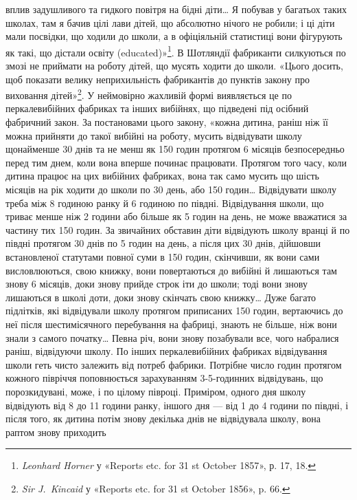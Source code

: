 \parcont{}  %
вплив задушливого та гидкого повітря на бідні діти\dots{} Я побував
у багатьох таких школах, там я бачив цілі лави дітей, що абсолютно
нічого не робили; і ці діти мали посвідки, що ходили до
школи, а в офіціяльній статистиці вони фігурують як такі, що
дістали освіту (educated)»\footnote{
\emph{Leonhard Horner} у «Reports etc. for 31 st October 1857», р. 17, 18.
}. В Шотляндії фабриканти силкуються
по змозі не приймати на роботу дітей, що мусять ходити до школи.
«Цього досить, щоб показати велику неприхильність фабрикантів
до пунктів закону про виховання дітей»\footnote{
\emph{Sir J.~Kincaid} у «Reports etc. for 31 st October 1856», p. 66.
}. У неймовірно
жахливій формі виявляється це по перкалевибійних фабриках та
інших вибійнях, що підведені під осібний фабричний закон.
За постановами цього закону, «кожна дитина, раніш ніж її можна
прийняти до такої вибійні на роботу, мусить відвідувати школу
щонайменше 30 днів та не менш як 150 годин протягом 6 місяців
безпосередньо перед тим днем, коли вона вперше починає працювати.
Протягом того часу, коли дитина працює на цих вибійних
фабриках, вона так само мусить що шість місяців на рік ходити
до школи по 30 день, або 150 годин\dots{} Відвідувати школу треба
між 8 годиною ранку й 6 годиною по півдні. Відвідування школи,
що триває менше ніж 2  години або більше як 5 годин на день,
не може вважатися за частину тих 150 годин. За звичайних обставин
діти відвідують школу вранці й по півдні протягом 30 днів
по 5 годин на день, а після цих 30 днів, дійшовши встановленої
статутами повної суми в 150 годин, скінчивши, як вони сами
висловлюються, свою книжку, вони повертаються до вибійні
й лишаються там знову 6 місяців, доки знову прийде строк іти
до школи; тоді вони знову лишаються в школі доти, доки знову
скінчать свою книжку\dots{} Дуже багато підлітків, які відвідували
школу протягом приписаних 150 годин, вертаючись до неї після
шестимісячного перебування на фабриці, знають не більше, ніж
вони знали з самого початку\dots{} Певна річ, вони знову позабували
все, чого набралися раніш, відвідуючи школу. По інших перкалевибійних
фабриках відвідування школи геть чисто залежить від
потреб фабрики. Потрібне число годин протягом кожного півріччя
поповнюється зарахуванням 3-5-годинних відвідувань, що порозкидувані,
може, і по цілому півроці. Приміром, одного дня
школу відвідують від 8 до 11 години ранку, іншого дня — від
1 до 4 години по півдні, і після того, як дитина потім знову декілька
днів не відвідувала школу, вона раптом знову приходить
